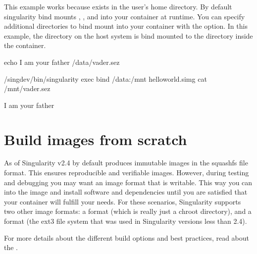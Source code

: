 \documentclass[letterpaper,10pt,english]{sphinxmanual}
\begin{document}
This example works because  exists in the user’s home directory. By
default singularity bind mounts , , and  into your container at
runtime.
You can specify additional directories to bind mount into your
container with the {\hyperref[\detokenize{bind_paths_and_mounts:bind-paths-and-mounts}]{}} option. In this example, the  directory on the host
system is bind mounted to the  directory inside the container.

%
\begin{sphinxVerbatim}[commandchars=\\\{\}]
\PYGZdl{} echo \PYGZdq{}I am your father\PYGZdq{} \PYGZgt{}/data/vader.sez

\PYGZdl{} \PYGZti{}/sing\PYGZhy{}dev/bin/singularity exec \PYGZhy{}\PYGZhy{}bind /data:/mnt hello\PYGZhy{}world.simg cat /mnt/vader.sez

I am your father
\end{sphinxVerbatim}


\section{Build images from scratch}
\label{\detokenize{quick_start:build-images-from-scratch}}\label{\detokenize{quick_start:id3}}\label{\detokenize{quick_start:sec-buildimagesfromscratch}}
As of Singularity v2.4 by default  produces immutable images in the
squashfs file format. This ensures reproducible and verifiable images.
However, during testing and debugging you may want an image format
that is writable. This way you can  into the image and install software
and dependencies until you are satisfied that your container will
fulfill your needs. For these scenarios, Singularity supports two
other image formats: a  format (which is really just a chroot
directory), and a  format (the ext3 file system that was used in
Singularity versions less than 2.4).

For more details about the different build options and best practices,
read about the {\hyperref[\detokenize{singularity_flow:singularity-flow}]{}}.
\end{document}
